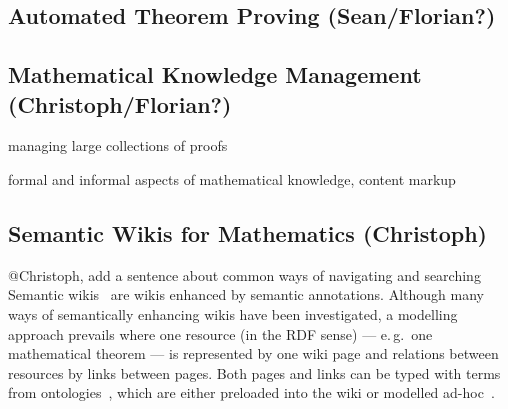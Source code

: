\documentclass{llncs}
\begin{document}
\subsection{Automated Theorem Proving (Sean/Florian?)}
\label{sec:atp}


\subsection{Mathematical Knowledge Management (Christoph/Florian?)}
\label{sec:mkm}

managing large collections of proofs

formal and informal aspects of mathematical knowledge, content markup


\subsection{Semantic Wikis for Mathematics (Christoph)}
\label{sec:semwiki}

\begin{todo}{@Christoph, add a sentence about common ways of navigating and searching}
  Semantic wikis~\cite{semwiki06} are wikis enhanced by semantic annotations.  Although
  many ways of semantically enhancing wikis have been investigated, a modelling approach
  prevails where one resource (in the RDF sense) --- e.\,g.\ one
  mathematical theorem --- is represented by one wiki page and relations between resources
  by links between pages.  Both pages and links can be typed with terms from
  ontologies~\cite{OrDeMoVoHa06:annotation-navigation-semwiki}, which are either preloaded
  into the wiki or modelled ad-hoc~\cite{KrSchVr:semwiki-reasoning07}.
\end{todo}

\end{document}
